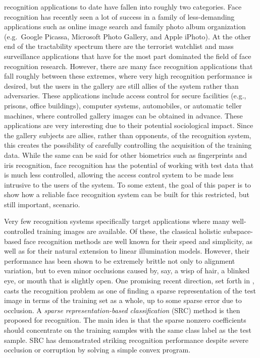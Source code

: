 \documentclass[10pt,journal,letterpaper,compsoc]{IEEEtran} %
\begin{document}
 recognition applications to date have fallen
into roughly two categories.  Face recognition has recently
seen a lot of success in a family of less-demanding
applications such as online image search and family photo album
organization (e.g.\ Google Picassa, Microsoft Photo Gallery,
and Apple iPhoto). At the other end of the tractability
spectrum there are the terrorist watchlist and mass
surveillance applications that have for the most part dominated
the field of face recognition research.  However, there are
many face recognition applications that fall roughly between
these extremes, where very high recognition performance is
desired, but the users in the gallery are still allies of the
system rather than adversaries.  These applications include
access control for secure facilities (e.g., prisons, office
buildings), computer systems, automobiles, or automatic teller
machines, where controlled gallery images can be obtained in
advance.  These applications are very interesting due to their
potential sociological impact.  Since the gallery subjects are
allies, rather than opponents, of the recognition system, this
creates the possibility of carefully controlling the
acquisition of the training data. While the same can be said
for other biometrics such as fingerprints and iris recognition,
face recognition has the potential of working with test data
that is much less controlled, allowing the access control
system to be made less intrusive to the users of the system. To
some extent, the goal of this paper is to show how a reliable
face recognition system can be built for this restricted, but
still important, scenario.

Very few recognition systems specifically target applications where many well-
controlled training images are available.  Of these, the classical holistic
subspace-based face recognition methods \cite{Turk1991-CVPR,Belhumeur1997-PAMI}
are well known for their speed and simplicity, as well as for their natural
extension to linear illumination models.  However, their performance has been
shown to be extremely brittle not only to alignment variation, but to even
minor occlusions caused by, say, a wisp of hair, a blinked eye, or mouth that
is slightly open. One promising recent direction, set forth in
\cite{Wright2009-PAMI}, casts the recognition problem as one of finding a
sparse representation of the test image in terms of the training set as a
whole, up to some sparse error due to occlusion. A \emph{sparse
representation-based classification} (SRC) method is then proposed for
recognition. The main idea is that the sparse nonzero coefficients should
concentrate on the training samples with the same class label as the test
sample. SRC has demonstrated striking recognition performance despite severe
occlusion or corruption by solving a simple convex program.
\end{document}
